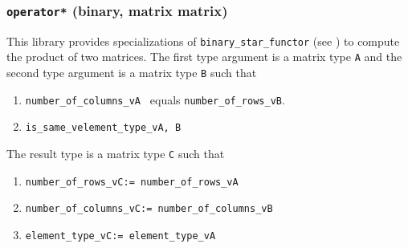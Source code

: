 \documentclass[oneside]{book}
\begin{document}
\subsubsection{\texttt{operator*} (binary, matrix matrix)}
This library provides specializations of
\texttt{binary\_star\_functor}
(see \cite{arithmeticfunctors}) to compute the
product
of two matrices. The first type argument is a matrix type \texttt{A} and the second type argument is a matrix type \texttt{B}
such that
\begin{enumerate}
	\item \texttt{number\_of\_columns\_v\textlangle A \textrangle} equals \texttt{number\_of\_rows\_v\textlangle B\textrangle}.
	\item \texttt{is\_same\_v\textlangle element\_type\_v\textlangle A, B\textrangle\textrangle}
\end{enumerate}
The result type is a matrix type \texttt{C} such that
\begin{enumerate}
	\item \texttt{number\_of\_rows\_v\textlangle C\textrangle := number\_of\_rows\_v\textlangle A\textrangle}
	\item \texttt{number\_of\_columns\_v\textlangle C\textrangle := number\_of\_columns\_v\textlangle B\textrangle}
	\item \texttt{element\_type\_v\textlangle C\textrangle := element\_type\_v\textlangle A\textrangle}
\end{enumerate}






\end{document}
